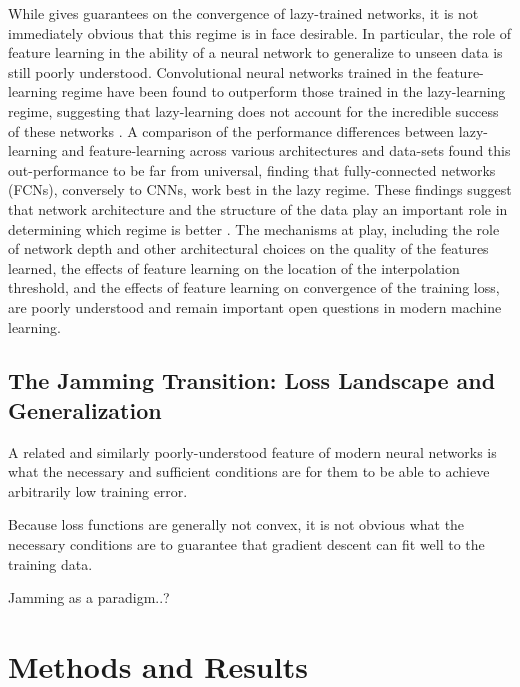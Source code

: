 \documentclass[a4paper, 12pt]{article}
\begin{document}
 While \cite{allen-zhuConvergenceTheoryDeep2019} gives guarantees on the convergence of lazy-trained networks, it is not immediately obvious that this regime is in face desirable. In particular, the role of feature learning in the ability of a neural network to generalize to unseen data is still poorly understood. Convolutional neural networks trained in the feature-learning regime have been found to outperform those trained in the lazy-learning regime, suggesting that lazy-learning does not account for the incredible success of these networks \cite{chizatLazyTrainingDifferentiable2020}. A comparison of the performance differences between lazy-learning and feature-learning across various architectures and data-sets found this out-performance to be far from universal, finding that fully-connected networks (FCNs), conversely to CNNs, work best in the lazy regime. These findings suggest that network architecture and the structure of the data play an important role in determining which regime is better \cite{geigerDisentanglingFeatureLazy2020}. The mechanisms at play, including the role of network depth and other architectural choices on the quality of the features learned, the effects of feature learning on the location of the interpolation threshold, and the effects of feature learning on convergence of the training loss, are poorly understood and remain important open questions in modern machine learning.











\subsection{The Jamming Transition: Loss Landscape and Generalization}

A related and similarly poorly-understood feature of modern neural networks is what the necessary and sufficient conditions are for them to be able to achieve arbitrarily low training error. 

Because loss functions are generally not convex, it is not obvious what the necessary conditions are to guarantee that gradient descent can fit well to the training data. 


Jamming as a paradigm..?

\section{Methods and Results}
\end{document}
